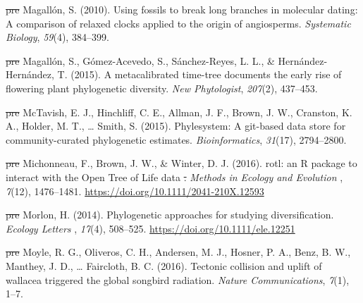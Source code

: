 \documentclass[english,man]{apa6} %
\providecommand{\DIFaddtex}[1]{{\protect\color{blue}\uwave{#1}}} %
\providecommand{\DIFdeltex}[1]{{\protect\color{red}\sout{#1}}}                      %
\providecommand{\DIFaddbegin}{} %
\providecommand{\DIFaddend}{} %
\providecommand{\DIFdelbegin}{} %
\providecommand{\DIFdelend}{} %
\providecommand{\DIFadd}[1]{\texorpdfstring{\DIFaddtex{#1}}{#1}} %
\providecommand{\DIFdel}[1]{\texorpdfstring{\DIFdeltex{#1}}{}} %
\newcommand{\DIFscaledelfig}{0.5}
\newlength{\DIFdelgraphicswidth} %
\newlength{\DIFdelgraphicsheight} %
\newcommand{\DIFaddincludegraphics}[2][]{{\color{blue}\fbox{\DIFOincludegraphics[#1]{#2}}}} %
\newcommand{\DIFdelincludegraphics}[2][]{%
\sbox{\DIFdelgraphicsbox}{\DIFOincludegraphics[#1]{#2}}%
\settoboxwidth{\DIFdelgraphicswidth}{\DIFdelgraphicsbox} %
\settoboxtotalheight{\DIFdelgraphicsheight}{\DIFdelgraphicsbox} %
\scalebox{\DIFscaledelfig}{%
\parbox[b]{\DIFdelgraphicswidth}{\usebox{\DIFdelgraphicsbox}\\[-\baselineskip] \rule{\DIFdelgraphicswidth}{0em}}\llap{\resizebox{\DIFdelgraphicswidth}{\DIFdelgraphicsheight}{%
\setlength{\unitlength}{\DIFdelgraphicswidth}%
\begin{picture}(1,1)%
\thicklines\linethickness{2pt} %
{\color[rgb]{1,0,0}\put(0,0){\framebox(1,1){}}}%
{\color[rgb]{1,0,0}\put(0,0){\line( 1,1){1}}}%
{\color[rgb]{1,0,0}\put(0,1){\line(1,-1){1}}}%
\end{picture}%
}\hspace*{3pt}}} %
} %
\DeclareRobustCommand{\DIFaddbegin}{\DIFOaddbegin \let\includegraphics\DIFaddincludegraphics} %
\DeclareRobustCommand{\DIFaddend}{\DIFOaddend \let\includegraphics\DIFOincludegraphics} %
\DeclareRobustCommand{\DIFdelbegin}{\DIFOdelbegin \let\includegraphics\DIFdelincludegraphics} %
\DeclareRobustCommand{\DIFdelend}{\DIFOaddend \let\includegraphics\DIFOincludegraphics} %
\begin{document}
\leavevmode\DIFdelbegin %
\DIFdel{pre}%
\DIFdelend \hypertarget{ref-magallon2010using}{}\DIFdelbegin %
\DIFdelend %
Magallón, S. (2010). Using fossils to break long branches in molecular dating: A comparison of relaxed clocks applied to the origin of angiosperms. \emph{Systematic Biology}, \emph{59}(4), 384--399.

\leavevmode\DIFdelbegin %
\DIFdel{pre}%
\DIFdelend \hypertarget{ref-magallon2015metacalibrated}{}\DIFdelbegin %
\DIFdelend %
Magallón, S., Gómez-Acevedo, S., Sánchez-Reyes, L. L., \& Hernández-Hernández, T. (2015). A metacalibrated time-tree documents the early rise of flowering plant phylogenetic diversity. \emph{New Phytologist}, \emph{207}(2), 437--453.

\leavevmode\DIFdelbegin %
\DIFdel{pre}%
\DIFdelend \hypertarget{ref-mctavish2015phylesystem}{}\DIFdelbegin %
\DIFdelend %
McTavish, E. J., Hinchliff, C. E., Allman, J. F., Brown, J. W., Cranston, K. A., Holder, M. T., \ldots{} Smith, S. (2015). Phylesystem: A git-based data store for community-curated phylogenetic estimates. \emph{Bioinformatics}, \emph{31}(17), 2794--2800.

\leavevmode\DIFdelbegin %
\DIFdel{pre}%
\DIFdelend \hypertarget{ref-Michonneau2016}{}\DIFdelbegin %
\DIFdelend %
Michonneau, F., Brown, J. W., \& Winter, D. J. (2016). \DIFdelbegin %
\DIFdelend rotl: an R package to interact with the Open Tree of Life data\DIFdelbegin %
\DIFdel{. }\DIFdelend \DIFaddbegin \DIFadd{. }\DIFaddend \emph{\DIFdelbegin %
\DIFdelend Methods in Ecology and Evolution\DIFdelbegin %
\DIFdelend }, \emph{7}(12), 1476--1481. \url{https://doi.org/10.1111/2041-210X.12593}

\leavevmode\DIFdelbegin %
\DIFdel{pre}%
\DIFdelend \hypertarget{ref-Morlon2014}{}\DIFdelbegin %
\DIFdelend %
Morlon, H. (2014). \DIFdelbegin %
\DIFdelend Phylogenetic approaches for studying diversification. \DIFdelbegin %
\DIFdelend \emph{\DIFdelbegin %
\DIFdelend Ecology Letters\DIFdelbegin %
\DIFdelend }, \emph{17}(4), 508--525. \url{https://doi.org/10.1111/ele.12251}

\leavevmode\DIFdelbegin %
\DIFdel{pre}%
\DIFdelend \hypertarget{ref-moyle2016tectonic}{}\DIFdelbegin %
\DIFdelend %
Moyle, R. G., Oliveros, C. H., Andersen, M. J., Hosner, P. A., Benz, B. W., Manthey, J. D., \ldots{} Faircloth, B. C. (2016). Tectonic collision and uplift of wallacea triggered the global songbird radiation. \emph{Nature Communications}, \emph{7}(1), 1--7.
\end{document}
